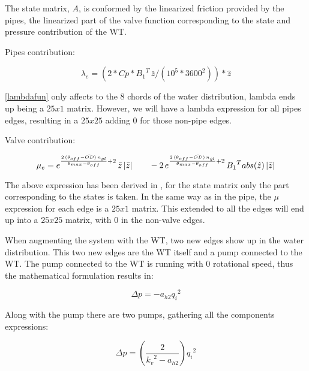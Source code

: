 The state matrix, $A$, is conformed by the linearized friction provided by the pipes, the linearized part of the valve function corresponding to the state and pressure contribution
of the WT.

Pipes contribution:

\begin{equation}
{\lambda}_e = (2 * Cp * {B_1}^{T} \, \bar{z} /(10^5*3600^2))*\hat{z}
\label{lambdafun}
\end{equation}

\eqref{lambdafun} only affects to the 8 chords of the water distribution, lambda ends up being a $25x1$ matrix. However, we will have a lambda expression for all pipes
edges, resulting in a $25x25$ adding $0$ for those non-pipe edges. 

Valve contribution:

\vspace{4mm}
\begin{equation}
  {\mu}_e = e^{\frac{2 \, (\theta_{off} - \bar{OD}) \, n_{gl}}{\theta_{max}-\theta_{off}}+2} \, \bar{z} \, |\bar{z}| \quad \quad - \\
  2 \, e^{\frac{2 \, (\theta_{off} - \bar{OD}) \, n_{gl}}{\theta_{max}-\theta_{off}}+2} \, {B_1}^{T} abs(\hat{z}) \, |\bar{z}|
  \label{mufun}
\end{equation}

The above expression has been derived in , for the state matrix only the part corresponding to the states is taken. In the same way 
as in the pipe, the $\mu$ expression for each edge is a $25x1$ matrix. This extended to all the edges will end up into a $25x25$ matrix, with $0$ in the 
non-valve edges. 

When augmenting the system with the WT, two new edges show up in the water distribution. This two new edges are the WT itself and a pump connected to the WT.
The pump connected to the WT is running with $0$ rotational speed, thus the mathematical formulation results in:

\begin{equation}
    \Delta p = -a_{h2}{q_i}^2 
\end{equation}

Along with the pump there are two pumps, gathering all the components expressions:

\begin{equation}
      \Delta p = (\frac{2}{{k_v}^2-a_{h2}}){q_i}^2 
\end{equation} 

